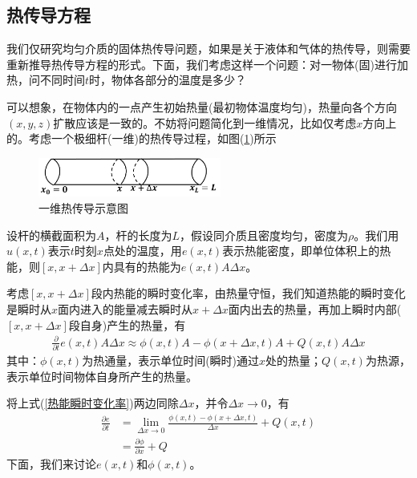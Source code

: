     \subsection{热传导方程}
        我们仅研究均匀介质的固体热传导问题，如果是关于液体和气体的热传导，则需要重新推导热传导方程的形式。下面，我们考虑这样一个问题：对一物体(固)进行加热，问不同时间$t$时，物体各部分的温度是多少？
        \par
        可以想象，在物体内的一点产生初始热量(最初物体温度均匀)，热量向各个方向$(x,y,z)$扩散应该是一致的。不妨将问题简化到一维情况，比如仅考虑$x$方向上的。考虑一个极细杆(一维)的热传导过程，如图(\ref{fig:一维热传导示意图})所示\\
		 \begin{figure}[H]
		\centering
		\includegraphics[width=6cm]{images/One_dimensional_heat_conduction.jpg}
		\caption{一维热传导示意图}
		\label{fig:一维热传导示意图}
		\end{figure}
        \par
        设杆的横截面积为$A$，杆的长度为$L$，假设同介质且密度均匀，密度为$\rho$。我们用$u(x,t)$表示$t$时刻$x$点处的温度，用$e(x,t)$表示热能密度，即单位体积上的热能，则$[x,x+\Delta x]$内具有的热能为$e(x,t) A \Delta x$。
        \par
        考虑$[x,x+\Delta x]$段内热能的瞬时变化率，由热量守恒，我们知道热能的瞬时变化是瞬时从$x$面内进入的能量减去瞬时从$x + \Delta x$面内出去的热量，再加上瞬时内部($[x,x+\Delta x]$段自身)产生的热量，有
        \begin{align}
            \label{热能瞬时变化率}
            \frac{\partial}{\partial t} e(x,t)A \Delta x \approx \phi(x,t)A - \phi (x+\Delta x, t) A + Q(x,t) A \Delta x
        \end{align}
        其中：$\phi(x,t)$为热通量，表示单位时间(瞬时)通过$x$处的热量；$Q(x,t)$为热源，表示单位时间物体自身所产生的热量。
        \par
        将上式(\ref{热能瞬时变化率})两边同除$\Delta x$，并令$\Delta x\rightarrow 0$，有
        \begin{align*}
            \frac{\partial e}{\partial t} &= \lim_{\Delta x \rightarrow 0} \frac{\phi (x,t) - \phi (x + \Delta x,t)}{\Delta x} + Q(x, t) \\
            &= \frac{\partial \phi }{\partial x} + Q
        \end{align*}
        下面，我们来讨论$e(x,t)$和$\phi(x,t)$。
